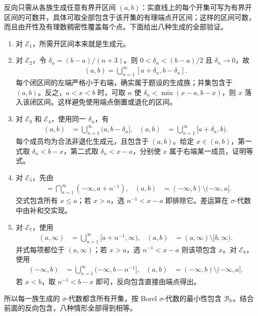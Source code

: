 \documentclass[../../main.tex]{subfiles}%
\begin{document}
\begin{solution}
反向只需从各族生成任意有界开区间 $(a,b)$：实直线上的每个开集可写为有界开区间的可数并，具体可取全部包含于该开集的有理端点开区间；这样的区间可数，而且由开性及有理数稠密性覆盖每个点。下面给出八种生成的全部验证。
\begin{enumerate}[label=\alph*.,ref=(\alph*)]
\item 对 $\mathscr{E}_1$，所需开区间本来就是生成元。
\item 对 $\mathscr{E}_2$，令 $\delta_n=(b-a)/(n+3)$。则 $0<\delta_n<(b-a)/2$ 且 $\delta_n\to0$，故
\begin{align*}
(a,b)=\bigcup_{n=1}^{\infty}[a+\delta_n,b-\delta_n].
\end{align*}
每个闭区间的左端严格小于右端，确实属于题设的生成族；并集包含于 $(a,b)$。反之，$a<x<b$ 时，可取 $n$ 使 $\delta_n<\min(x-a,b-x)$，则 $x$ 落入该闭区间。这样避免使用端点倒置或退化的区间。
\item 对 $\mathscr{E}_3$ 和 $\mathscr{E}_4$，使用同一 $\delta_n$，有
\begin{align*}
(a,b)&=\bigcup_{n=1}^{\infty}(a,b-\delta_n],&
(a,b)&=\bigcup_{n=1}^{\infty}[a+\delta_n,b).
\end{align*}
每个成员均为合法非退化生成元，且包含于 $(a,b)$。给定 $x\in(a,b)$，第一式取 $\delta_n<b-x$，第二式取 $\delta_n<x-a$，分别使 $x$ 属于右端某一成员，证明等式。
\item 对 $\mathscr{E}_5$，先由
\begin{align*}
[b,\infty)&=\bigcap_{n=1}^{\infty}(b-n^{-1},\infty),&
(a,b)&=(a,\infty)\setminus[b,\infty)
\end{align*}
得到开区间。交式包含所有 $x\geqslant b$；若 $x<b$，选 $n$ 使 $n^{-1}<b-x$ 即排除 $x$。对 $\mathscr{E}_6$，对应地使用
\begin{align*}
(-\infty,a]&=\bigcap_{n=1}^{\infty}(-\infty,a+n^{-1}),&
(a,b)&=(-\infty,b)\setminus(-\infty,a].
\end{align*}
交式包含所有 $x\leqslant a$；若 $x>a$，选 $n^{-1}<x-a$ 即排除它。差运算在 $\sigma$-代数中由补和交实现。
\item 对 $\mathscr{E}_7$，使用
\begin{align*}
(a,\infty)&=\bigcup_{n=1}^{\infty}[a+n^{-1},\infty),&
(a,b)&=(a,\infty)\setminus[b,\infty).
\end{align*}
并式每项都位于 $(a,\infty)$；若 $x>a$，选 $n^{-1}<x-a$ 则该项包含 $x$。对 $\mathscr{E}_8$，使用
\begin{align*}
(-\infty,b)&=\bigcup_{n=1}^{\infty}(-\infty,b-n^{-1}],&
(a,b)&=(-\infty,b)\setminus(-\infty,a].
\end{align*}
若 $x<b$，取 $n^{-1}<b-x$ 即可，反向包含直接由端点得出。
\end{enumerate}
所以每一族生成的 $\sigma$-代数都含所有开集，按 Borel $\sigma$-代数的最小性包含 $\mathscr{B}_{\mathbb{R}}$。结合前面的反向包含，八种情形全部得到相等。
\end{solution}
\end{document}
